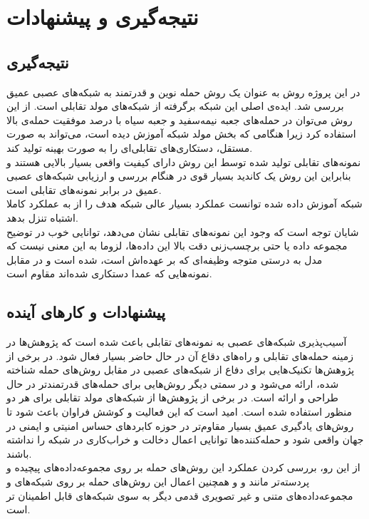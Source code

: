 \chapter{نتیجه‌گیری و پیشنهادات}
\thispagestyle{empty}

\section{نتیجه‌گیری}
در این پروژه روش 
به عنوان یک روش حمله نوین و قدرتمند به شبکه‌های عصبی عمیق بررسی شد. ایده‌ی اصلی این شبکه برگرفته از شبکه‌های مولد تقابلی است. از این روش می‌توان در حمله‌های جعبه نیمه‌سفید و جعبه سیاه با درصد موفقیت حمله‌ی بالا استفاده کرد زیرا هنگامی که بخش مولد شبکه 
آموزش دیده است، می‌تواند به صورت مستقل، دستکاری‌های تقابلی‌ای را به صورت بهینه تولید کند.
\\
نمونه‌های تقابلی تولید شده توسط این روش دارای کیفیت واقعی بسیار بالایی هستند و بنابراین این روش یک کاندید بسیار قوی در هنگام بررسی و ارزیابی شبکه‌های عصبی عمیق در برابر نمونه‌های تقابلی است. 
\\
شبکه آموزش داده شده توانست عملکرد بسیار عالی شبکه هدف را از 
به عملکرد کاملا اشتباه
تنزل بدهد.
\\
شایان توجه است که وجود این نمونه‌های تقابلی نشان می‌دهد، توانایی خوب در توضیح مجموعه داده یا حتی برچسب‌زنی دقت بالا این داده‌ها، لزوما به این معنی نیست که مدل به درستی متوجه وظیفه‌ای که بر عهده‌اش است، شده است و در مقابل نمونه‌هایی که عمدا دستکاری شده‌اند مقاوم است.


\section{پیشنهادات و کار‌های آینده}
آسیب‌پذیری شبکه‌های عصبی به ‌نمونه‌‌های تقابلی باعث شده است که پژوهش‌ها در زمینه حمله‌های تقابلی و راه‌های دقاع آن در حال حاضر بسیار فعال شود. در برخی از پژوهش‌ها تکنیک‌هایی برای دفاع از شبکه‌های عصبی در مقابل روش‌های حمله شناخته شده، ارائه می‌شود و در سمتی دیگر روش‌هایی برای حمله‌های قدرتمند‌تر در حال طراحی و ارائه است. در برخی از پژوهش‌ها از شبکه‌های مولد تقابلی برای هر دو منظور استفاده شده است. امید است که این فعالیت و کوشش فراوان باعث شود تا روش‌های یادگیری عمیق بسیار مقاوم‌تر در حوزه کابردهای حساس امنیتی و ایمنی در جهان واقعی شود و حمله‌کننده‌ها توانایی اعمال دخالت و خراب‌کاری در شبکه را نداشته باشند.
\\ 
از این رو، بررسی کردن عملکرد این روش‌های حمله بر روی مجموعه‌داده‌های پیچیده و پردسته‌تر مانند 
و
و همچنین اعمال این روش‌های حمله بر روی شبکه‌های 
و مجموعه‌داده‌های متنی و غیر تصویری قدمی دیگر به سوی شبکه‌های قابل اطمینان تر است.


